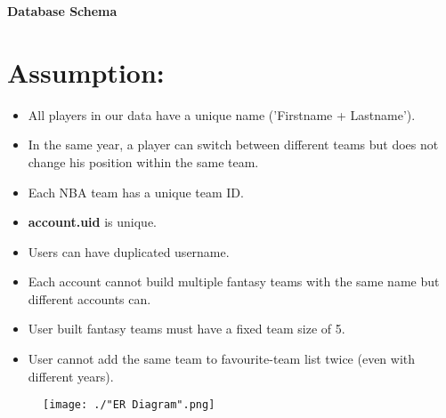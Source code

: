 \documentclass[11pt]{article}
\begin{document}
\begin{center}
{\LARGE\bf Database Schema}
\end{center}

\section*{Assumption:}

\begin{itemize}
	\item All players in our data have a unique name ('Firstname + Lastname').
	\item In the same year, a player can switch between different teams but does not change his position within the same team.
	\item Each NBA team has a unique team ID.
	\item {\bf account.uid} is unique.
	\item Users can have duplicated username.
	\item Each account cannot build multiple fantasy teams with the same name but different accounts can.
	\item User built fantasy teams must have a fixed team size of 5.
	\item User cannot add the same team to favourite-team list twice (even with different years).
\end{itemize}

\newpage

\begin{figure} 
  \texttt{[image: ./"ER Diagram".png]}
\end{figure}
\newpage
\end{document}
